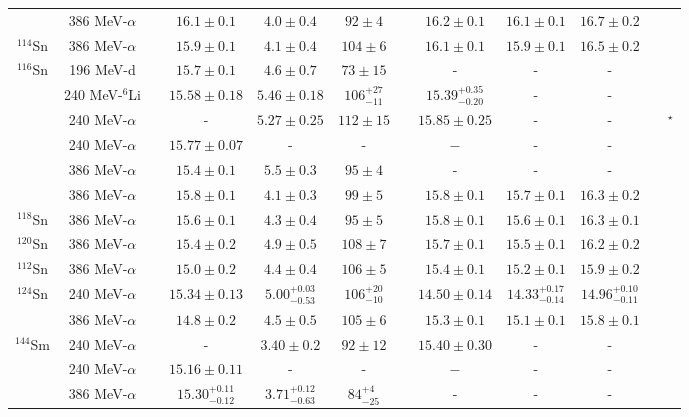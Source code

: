 \begin{table}[t!]
{\begin{tabular}{@{}cccccccccc@{}cc}
  & 386 MeV-$\alpha$ & & $16.1\pm0.1$ & $4.0\pm0.4$ & $92\pm4$ & & $16.2\pm0.1$ & $16.1\pm0.1$ & $16.7\pm0.2$ & & \cite{Li_2010} \\
$^{114}$Sn & 386 MeV-$\alpha$ & & $15.9\pm0.1$ & $4.1\pm0.4$ & $104\pm6$ & & $16.1\pm0.1$ & $15.9\pm0.1$ & $16.5\pm0.2$ & & \cite{Li_2010}  \\
$^{116}$Sn & 196 MeV-d & & $15.7\pm0.1$ & $4.6\pm0.7$ & $73\pm15$ & & - & - & - & & \cite{Darshana2015} \\			
  & 240 MeV-$^{6}$Li & & $15.58\pm0.18$ & $5.46\pm0.18$ & ${106}^{+27}_{-11}$ & & ${15.39}^{+0.35}_{-0.20}$ & - & - & & \cite{DHY2009_Sn}\\
  & 240 MeV-$\alpha$ & & - & $5.27\pm0.25$ & $112\pm15$ & & $15.85\pm0.25$ & - & - & & \cite{dhybg}$^\star$\\	
  & 240 MeV-$\alpha$ & & $15.77\pm0.07$ & - & -& & $-$ & - & - & & \cite{dhyprl}\\	
  & 386 MeV-$\alpha$ & & $15.4\pm0.1$ & $5.5\pm0.3$ & $95\pm4$ & & - & - & - & & \cite{Uchida_90Zr} \\	
  & 386 MeV-$\alpha$ & & $15.8\pm0.1$ & $4.1\pm0.3$ & $99\pm5$ & & $15.8\pm0.1$ & $15.7\pm0.1$ & $16.3\pm0.2$ & & \cite{Li_2010}  \\	
$^{118}$Sn& 386 MeV-$\alpha$ & & $15.6\pm0.1$ & $4.3\pm0.4$ & $95\pm5$ & & $15.8\pm0.1$ & $15.6\pm0.1$ & $16.3\pm0.1$ & & \cite{Li_2010}  \\
$^{120}$Sn& 386 MeV-$\alpha$ & & $15.4\pm0.2$ & $4.9\pm0.5$ & $108\pm7$ & & $15.7\pm0.1$ & $15.5\pm0.1$ & $16.2\pm0.2$ & & \cite{Li_2010}  \\
$^{112}$Sn & 386 MeV-$\alpha$ & & $15.0\pm0.2$ & $4.4\pm0.4$ & $106\pm5$ & & $15.4\pm0.1$ & $15.2\pm0.1$ & $15.9\pm0.2$ & & \cite{Li_2010}  \\
$^{124}$Sn & 240 MeV-$\alpha$ & & $15.34\pm0.13$ & ${5.00}^{+0.03}_{-0.53}$ & ${106}^{+20}_{-10}$ && $14.50\pm0.14$  & ${14.33}^{+0.17}_{-0.14}$ & ${14.96}^{+0.10}_{-0.11}$ & & \cite{DHY2004_Sn}\\	
  & 386 MeV-$\alpha$ & & $14.8\pm0.2$ & $4.5\pm0.5$ & $105\pm6$ & & $15.3\pm0.1$ & $15.1\pm0.1$ & $15.8\pm0.1$ & & \cite{Li_2010} \\		
$^{144}$Sm & 240 MeV-$\alpha$ & & - & $3.40\pm0.2$ & $92\pm12$ & & $15.40\pm0.30$ & - & - & & \cite{dhybg}\\	
  & 240 MeV-$\alpha$ & & $15.16\pm0.11$ & - & - & & $-$ & - & - & & \cite{dhyprl}\\	
  & 386 MeV-$\alpha$ & & ${15.30}^{+0.11}_{-0.12}$& ${3.71}^{+0.12}_{-0.63}$ & ${84}^{+4}_{-25}$ & & - & - & - & & \cite{Itoh_prc2003}\\	

\end{tabular}}
\end{table}
